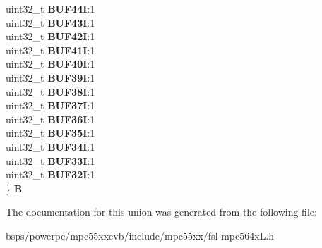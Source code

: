 \begin{DoxyCompactItemize}
\begin{tabbing}
\>uint32\_t {\bfseries BUF44I}:1\\
\>uint32\_t {\bfseries BUF43I}:1\\
\>uint32\_t {\bfseries BUF42I}:1\\
\>uint32\_t {\bfseries BUF41I}:1\\
\>uint32\_t {\bfseries BUF40I}:1\\
\>uint32\_t {\bfseries BUF39I}:1\\
\>uint32\_t {\bfseries BUF38I}:1\\
\>uint32\_t {\bfseries BUF37I}:1\\
\>uint32\_t {\bfseries BUF36I}:1\\
\>uint32\_t {\bfseries BUF35I}:1\\
\>uint32\_t {\bfseries BUF34I}:1\\
\>uint32\_t {\bfseries BUF33I}:1\\
\>uint32\_t {\bfseries BUF32I}:1\\
\} {\bfseries B}\\

\end{tabbing}\end{DoxyCompactItemize}


The documentation for this union was generated from the following file\+:\begin{DoxyCompactItemize}
\item 
bsps/powerpc/mpc55xxevb/include/mpc55xx/fsl-\/mpc564x\+L.\+h\end{DoxyCompactItemize}
